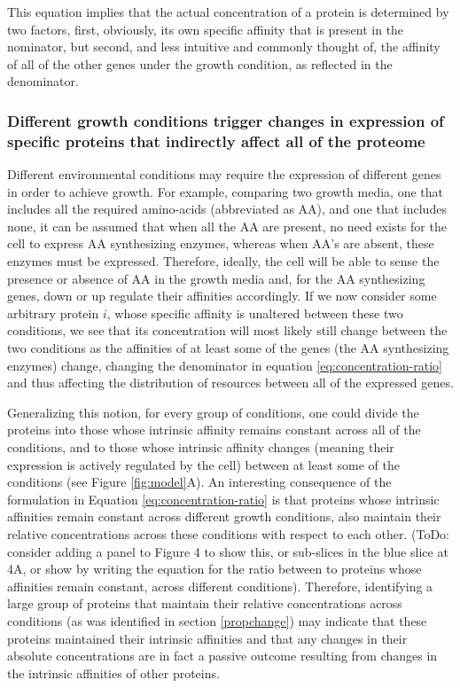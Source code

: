 \documentclass[notitlepage]{article}
\begin{document}
This equation implies that the actual concentration of a protein is determined by two factors, first, obviously, its own specific affinity that is present in the nominator, but second, and less intuitive and commonly thought of, the affinity of all of the other genes under the growth condition, as reflected in the denominator.

\subsubsection{Different growth conditions trigger changes in expression of specific proteins that indirectly affect all of the proteome}
Different environmental conditions may require the expression of different genes in order to achieve growth.
For example, comparing two growth media, one that includes all the required amino-acids (abbreviated as AA), and one that includes none, it can be assumed that when all the AA are present, no need exists for the cell to express AA synthesizing enzymes, whereas when AA's are absent, these enzymes must be expressed.
Therefore, ideally, the cell will be able to sense the presence or absence of AA in the growth media and, for the AA synthesizing genes, down or up regulate their affinities accordingly.
If we now consider some arbitrary protein $i$, whose specific affinity is unaltered between these two conditions, we see that its concentration will most likely still change between the two conditions as the affinities of at least some of the genes (the AA synthesizing enzymes) change, changing the denominator in equation \ref{eq:concentration-ratio} and thus affecting the distribution of resources between all of the expressed genes.

Generalizing this notion, for every group of conditions, one could divide the proteins into those whose intrinsic affinity remains constant across all of the conditions, and to those whose intrinsic affinity changes (meaning their expression is actively regulated by the cell) between at least some of the conditions (see Figure \ref{fig:model}A).
An interesting consequence of the formulation in Equation \ref{eq:concentration-ratio} is that proteins whose intrinsic affinities remain constant across different growth conditions, also maintain their relative concentrations across these conditions with respect to each other.
(ToDo: consider adding a panel to Figure 4 to show this, or sub-slices in the blue slice at 4A, or show by writing the equation for the ratio between to proteins whose affinities remain constant, across different conditions).
Therefore, identifying a large group of proteins that maintain their relative concentrations across conditions (as was identified in section \ref{propchange}) may indicate that these proteins maintained their intrinsic affinities and that any changes in their absolute concentrations are in fact a passive outcome resulting from changes in the intrinsic affinities of other proteins.
\end{document}
